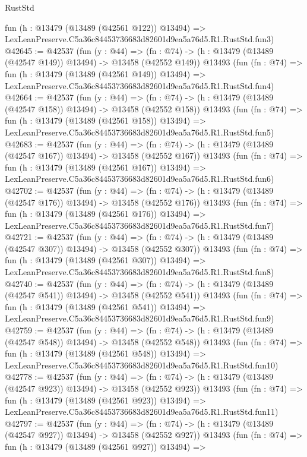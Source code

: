\begin{lexlean}{RustStd}
\begin{coremodule}
    fun (h : @13479 (@13489 (@42561 @122)) @13494) =>
    LexLeanPreserve.C5a36c84453736683d82601d9ea5a76d5.R1.RustStd.fun3)
@42645 := @42537
    (fun (y : @44) =>
    (fn : @74) -> (h : @13479 (@13489 (@42547 @149)) @13494) -> @13458 (@42552 @149))
    @13493
    (fun (fn : @74) =>
    fun (h : @13479 (@13489 (@42561 @149)) @13494) =>
    LexLeanPreserve.C5a36c84453736683d82601d9ea5a76d5.R1.RustStd.fun4)
@42664 := @42537
    (fun (y : @44) =>
    (fn : @74) -> (h : @13479 (@13489 (@42547 @158)) @13494) -> @13458 (@42552 @158))
    @13493
    (fun (fn : @74) =>
    fun (h : @13479 (@13489 (@42561 @158)) @13494) =>
    LexLeanPreserve.C5a36c84453736683d82601d9ea5a76d5.R1.RustStd.fun5)
@42683 := @42537
    (fun (y : @44) =>
    (fn : @74) -> (h : @13479 (@13489 (@42547 @167)) @13494) -> @13458 (@42552 @167))
    @13493
    (fun (fn : @74) =>
    fun (h : @13479 (@13489 (@42561 @167)) @13494) =>
    LexLeanPreserve.C5a36c84453736683d82601d9ea5a76d5.R1.RustStd.fun6)
@42702 := @42537
    (fun (y : @44) =>
    (fn : @74) -> (h : @13479 (@13489 (@42547 @176)) @13494) -> @13458 (@42552 @176))
    @13493
    (fun (fn : @74) =>
    fun (h : @13479 (@13489 (@42561 @176)) @13494) =>
    LexLeanPreserve.C5a36c84453736683d82601d9ea5a76d5.R1.RustStd.fun7)
@42721 := @42537
    (fun (y : @44) =>
    (fn : @74) -> (h : @13479 (@13489 (@42547 @307)) @13494) -> @13458 (@42552 @307))
    @13493
    (fun (fn : @74) =>
    fun (h : @13479 (@13489 (@42561 @307)) @13494) =>
    LexLeanPreserve.C5a36c84453736683d82601d9ea5a76d5.R1.RustStd.fun8)
@42740 := @42537
    (fun (y : @44) =>
    (fn : @74) -> (h : @13479 (@13489 (@42547 @541)) @13494) -> @13458 (@42552 @541))
    @13493
    (fun (fn : @74) =>
    fun (h : @13479 (@13489 (@42561 @541)) @13494) =>
    LexLeanPreserve.C5a36c84453736683d82601d9ea5a76d5.R1.RustStd.fun9)
@42759 := @42537
    (fun (y : @44) =>
    (fn : @74) -> (h : @13479 (@13489 (@42547 @548)) @13494) -> @13458 (@42552 @548))
    @13493
    (fun (fn : @74) =>
    fun (h : @13479 (@13489 (@42561 @548)) @13494) =>
    LexLeanPreserve.C5a36c84453736683d82601d9ea5a76d5.R1.RustStd.fun10)
@42778 := @42537
    (fun (y : @44) =>
    (fn : @74) -> (h : @13479 (@13489 (@42547 @923)) @13494) -> @13458 (@42552 @923))
    @13493
    (fun (fn : @74) =>
    fun (h : @13479 (@13489 (@42561 @923)) @13494) =>
    LexLeanPreserve.C5a36c84453736683d82601d9ea5a76d5.R1.RustStd.fun11)
@42797 := @42537
    (fun (y : @44) =>
    (fn : @74) -> (h : @13479 (@13489 (@42547 @927)) @13494) -> @13458 (@42552 @927))
    @13493
    (fun (fn : @74) =>
    fun (h : @13479 (@13489 (@42561 @927)) @13494) =>

\end{coremodule}
\end{lexlean}
